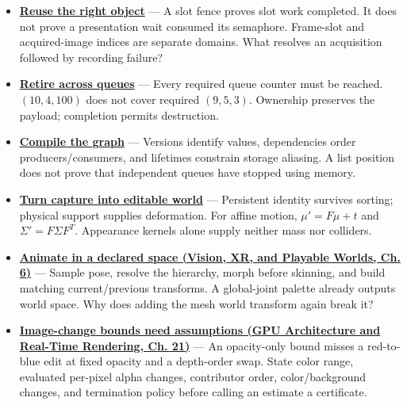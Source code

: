 \begin{itemize}
\item
  \textbf{\hyperref[01-foundations-i-ch011-follow-a-frame-slot-and-a-presentation-image-separately]{Reuse the right object}} --- A slot fence proves slot work completed. It does not prove a presentation wait consumed its semaphore. Frame-slot and acquired-image indices are separate domains. What resolves an acquisition followed by recording failure?
\item
  \textbf{\hyperref[01-foundations-i-ch011-retire-a-resource-after-every-user-not-after-one-convenient-clock]{Retire across queues}} --- Every required queue counter must be reached. \((10,4,100)\) does not cover required \((9,5,3)\). Ownership preserves the payload; completion permits destruction.
\item
  \textbf{\hyperref[06-engine-ii-ch042-compile-a-render-graph-before-executing-it]{Compile the graph}} --- Versions identify values, dependencies order producers/consumers, and lifetimes constrain storage aliasing. A list position does not prove that independent queues have stopped using memory.
\item
  \textbf{\hyperref[06-engine-ii-ch042-rendering-identity-becomes-world-identity-only-through-an-explicit-bridge]{Turn capture into editable world}} --- Persistent identity survives sorting; physical support supplies deformation. For affine motion, \(\mu'=F\mu+t\) and \(\Sigma'=F\Sigma F^T\). Appearance kernels alone supply neither mass nor colliders.
\item
  \textbf{\href{../07-Vision-XR-and-Playable-Worlds/main.pdf\#nameddest=04-visual-computing-ii-ch037-build-a-pose-first-then-deform-the-surface}{Animate in a declared space (Vision, XR, and Playable Worlds, Ch. 6)}} --- Sample pose, resolve the hierarchy, morph before skinning, and build matching current/previous transforms. A global-joint palette already outputs world space. Why does adding the mesh world transform again break it?
\item
  \textbf{\href{../06-GPU-Architecture-and-Real-Time-Rendering/main.pdf\#nameddest=06-engine-ii-ch045-an-image-change-certificate-must-name-the-edits-it-covers}{Image-change bounds need assumptions (GPU Architecture and Real-Time Rendering, Ch. 21)}} --- An opacity-only bound misses a red-to-blue edit at fixed opacity and a depth-order swap. State color range, evaluated per-pixel alpha changes, contributor order, color/background changes, and termination policy before calling an estimate a certificate.
\end{itemize}

